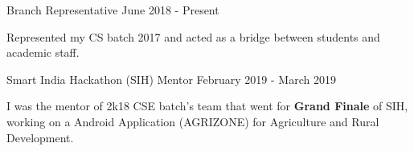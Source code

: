 

\begin{cventries}

  \projects
    {} %
    {Branch Representative} %
    {June 2018 - Present} %
    {} %
    {
      \begin{por} %
        \item []{Represented my CS batch 2017 and acted as a bridge between students and academic staff.}
      \end{por}
    }

\projects
    {} %
    {Smart India Hackathon (SIH) Mentor} %
    {February 2019 - March 2019} %
    {} %
    {
      \begin{por} %
        \item []{I was the mentor of 2k18 CSE batch's team that went for \textbf{Grand Finale} of SIH, working on a Android Application (AGRIZONE) for Agriculture and Rural Development.}
      \end{por}
    }

\end{cventries}
